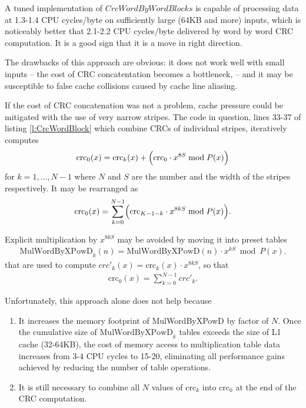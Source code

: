 \documentclass{article}
\begin{document}
A tuned implementation of $CrcWordByWordBlocks$ is capable of processing
data at 1.3-1.4 CPU cycles/byte on sufficiently large (64KB and more)
inputs, which is noticeably better that 2.1-2.2 CPU cycles/byte delivered
by word by word CRC computation. It is a good sign that it is a move in
right direction.

The drawbacks of this approach are obvious: it does not work well with
small inputs -- the cost of CRC concatentation becomes a bottleneck, -- and
it may be susceptible to false cache collisions caused by cache line
aliasing.

If the cost of CRC concatenation was not a problem, cache pressure could be
mitigated with the use of very narrow stripes. The code in question, lines
33-37 of listing \ref{l:CrcWordBlock} which combine CRCs of individual
stripes, iteratively computes
  \begin{align*}
    \mbox{crc}_0(x) = \mbox{crc}_k(x) + \Bigl(\mbox{crc}_0 \cdot x^{8S} \bmod P(x)\Bigr)
  \end{align*}
for $k = 1, \ldots, N-1$ where $N$ and $S$ are the number and the width of
the stripes respectively. It may be rearranged as
  \begin{align*}
    \mbox{crc}_0(x) = \sum_{k = 0}^{N-1} \Bigl(\mbox{crc}_{K-1-k} \cdot x^{8kS} \bmod P(x)\Bigr).
  \end{align*}

Explicit multiplication by $x^{8kS}$ may be avoided by moving it into preset
tables
  \begin{align*}
    \mbox{MulWordByXPowD}_k(n) = \mbox{MulWordByXPowD}(n) \cdot x^{kS} \bmod P(x).
  \end{align*}
that are used to compute $crc'_k(x) = \mbox{crc}_k(x) \cdot x^{8kS}$, so that
  \begin{align*}
    \mbox{crc}_0(x) = \sum_{k = 0}^{N-1} crc'_k.
  \end{align*}

Unfortunately, this approach alone does not help because
\begin{enumerate}
\item
  It increases the memory footprint of MulWordByXPowD by factor of $N$.
  Once the cumulative size of $\mbox{MulWordByXPowD}_k$ tables exceeds the
  size of L1 cache (32-64KB), the cost of memory access to multiplication
  table data increases from 3-4 CPU cycles to 15-20, eliminating all
  performance gains achieved by reducing the number of table operations.
\item
  It is still necessary to combine all $N$ values of $\mbox{crc}_k$ into
  $\mbox{crc}_0$ at the end of the CRC computation.
\end{enumerate}
\end{document}
